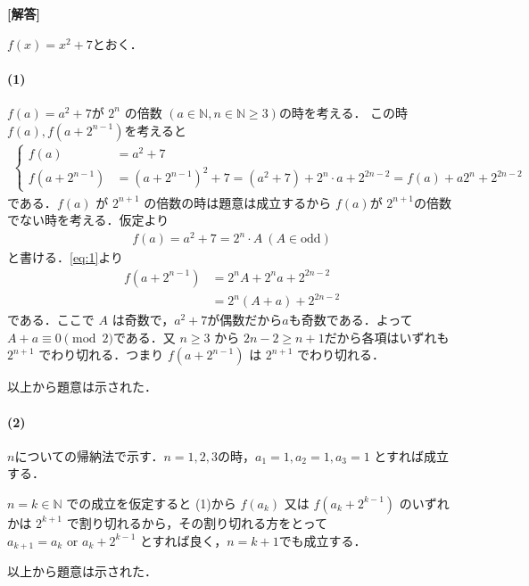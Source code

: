 \documentclass[../../main.tex]{subfiles}
\begin{document}
\begin{oframed}
  
\end{oframed}

{\bf [解答]}

$f(x) = x^2+7$とおく．

\paragraph{(1)}

$f(a)=a^2+7$が $2^n$ の倍数 $(a \in \mathbb{N}, n \in \mathbb{N} \ge 3)$の時を考える．
この時$f(a),f(a+2^{n-1})$を考えると
\begin{align}
  \begin{cases}
    f(a) &= a^2+7 \\
    f(a+2^{n-1}) &= (a+2^{n-1})^2+7 = (a^2+7) + 2^n \cdot a + 2^{2n-2} = f(a) +a2^n + 2^{2n-2}
  \end{cases} \label{eq:1}
\end{align}
である．$f(a)$ が $2^{n+1}$ の倍数の時は題意は成立するから $f(a)$が $2^{n+1}$の倍数でない時を考える．仮定より
\begin{align}
  f(a) = a^2+7 = 2^n \cdot A \ (A \in \text{odd}) \label{eq:2}
\end{align}
と書ける．\cref{eq:1}より
\begin{align}
  f(a+2^{n-1})
  &= 2^n A + 2^n a + 2^{2n-2} \\
  &= 2^n (A+a) + 2^{2n-2} \label{eq:3}
\end{align}
である．ここで $A$ は奇数で，$a^2+7$が偶数だから$a$も奇数である．よって $A+a \equiv 0 \pmod 2$である．又 $n \ge 3$ から $2n-2 \ge n+1$だから各項はいずれも $2^{n+1}$ でわり切れる．つまり $f(a+2^{n-1})$ は $2^{n+1}$ でわり切れる．

以上から題意は示された．

\paragraph{(2)}

$n$についての帰納法で示す．$n=1,2,3$の時，$a_1=1, a_2=1, a_3=1$ とすれば成立する．

$n=k \in \mathbb{N}$ での成立を仮定すると (1)から $f(a_k)$ 又は $f(a_k+2^{k-1})$ のいずれかは $2^{k+1}$ で割り切れるから，その割り切れる方をとって $a_{k+1} = a_k \text{ or } a_k+2^{k-1}$ とすれば良く，$n=k+1$でも成立する．

以上から題意は示された．
\end{document}
